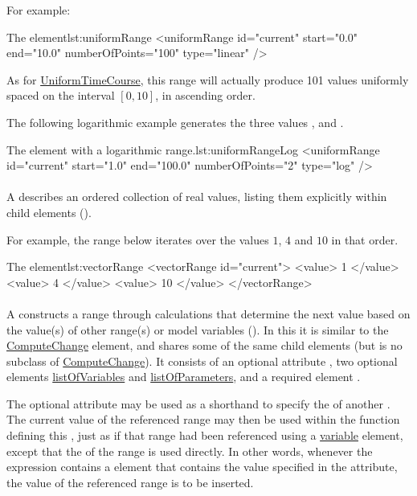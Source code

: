 For example:
\begin{myXmlLst}{The  element}{lst:uniformRange}
<uniformRange id="current" start="0.0" end="10.0" numberOfPoints="100" type="linear" /> 
\end{myXmlLst}
As for \hyperref[class:uniformTimeCourse]{UniformTimeCourse}, this range will actually produce 101 values uniformly spaced on the interval $[0, 10]$, in ascending order.

The following logarithmic example generates the three values ,  and .
\begin{myXmlLst}{The  element with a logarithmic range.}{lst:uniformRangeLog}
<uniformRange id="current" start="1.0" end="100.0" numberOfPoints="2" type="log" />
\end{myXmlLst}

\paragraph{}
\label{class:vectorRange}

A  describes an ordered collection of real values, listing them explicitly within child  elements ().

For example, the range below iterates over the values $1$, $4$ and $10$ in that order.
\begin{myXmlLst}{The  element}{lst:vectorRange}
<vectorRange id="current"> 
	<value> 1 </value> 
	<value> 4 </value> 
	<value> 10 </value> 
</vectorRange> 
\end{myXmlLst}

\paragraph{}
\label{class:functionalRange}
A  constructs a range through calculations that determine the next value based on the value(s) of other range(s) or model variables (). In this it is similar to the \hyperref[class:computeChange]{ComputeChange} element, and shares some of the same child elements (but is no subclass of \hyperref[class:computeChange]{ComputeChange}). It consists of an optional attribute , two optional elements \hyperref[sec:listOfVariables]{listOfVariables} and \hyperref[sec:listOfParameters]{listOfParameters}, and a required element .

The optional attribute  may be used as a shorthand to specify the  of another . The current value of the referenced range may then be used within the function defining this , just as if that range had been referenced using a \hyperref[class:variable]{variable} element, except that the  of the range is used directly. In other words, whenever the expression contains a  element that contains the value specified in the  attribute, the value of the referenced range is to be inserted.

